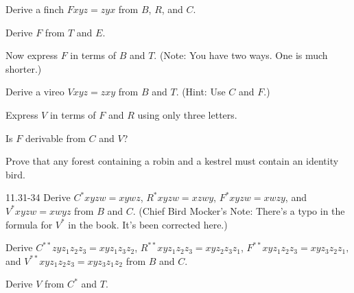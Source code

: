 \documentclass[12pt, letterpaper]{article}
\begin{document}
\begin{prob}{11.24}
Derive a finch $Fxyz = zyx$ from $B$, $R$, and $C$.
\end{prob}

\begin{prob}{11.25}
Derive $F$ from $T$ and $E$.
\end{prob}

\begin{prob}{11.26}
Now express $F$ in terms of $B$ and $T$. (Note: You have two ways. One is much shorter.)
\end{prob}

\begin{prob}{11.27}
Derive a vireo $Vxyz = zxy$ from $B$ and $T$. (Hint: Use $C$ and $F$.)
\end{prob}

\begin{prob}{11.28}
Express $V$ in terms of $F$ and $R$ using only three letters.
\end{prob}

\begin{prob}{11.29}
Is $F$ derivable from $C$ and $V$?
\end{prob}

\begin{prob}{11.30}
Prove that any forest containing a robin and a kestrel must contain an identity bird.
\end{prob}

\begin{prob}{11.31-34}
Derive $C^*xyzw = xywz$, $R^*xyzw = xzwy$, $F^*xyzw = xwzy$, and $V^*xyzw = xwyz$ from $B$ and $C$. (Chief Bird Mocker's Note: There's a typo in the formula for $V^*$ in the book. It's been corrected here.)
\end{prob}

\begin{prob}{11.35}
Derive $C^{**}zyz_1z_2z_3 = xyz_1z_3z_2$, $R^{**}xyz_1z_2z_3 = xyz_2z_3z_1$, $F^{**}xyz_1z_2z_3 = xyz_3z_2z_1,$ and $V^{**}xyz_1z_2z_3 = xyz_3z_1z_2$ from $B$ and $C$.
\end{prob}

\begin{prob}{11.36}
Derive $V$ from $C^*$ and $T$.
\end{prob}
\end{document}
